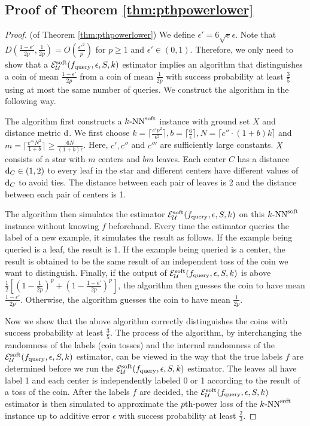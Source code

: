 \subsection{Proof of Theorem \ref{thm:pthpowerlower}}
\label{subsec:proofpthpowerlower}
\begin{proof}(of Theorem \ref{thm:pthpowerlower})
We define $\epsilon'=6\sqrt{e}\epsilon$. Note that $D(\frac{1-\epsilon'}{2p},\frac{1}{2p})=O(\frac{{\epsilon'}^2}{p})$ for $p\geq 1$ and $\epsilon'\in(0,1)$. Therefore, we only need to show that a  $\mathcal{E}^{\mathrm{soft}}_{{\mathcal{U}}}(f_{\mathrm{query}},\epsilon,S,k)$ estimator implies an algorithm that distinguishes a coin of mean $\frac{1-\epsilon'}{2p}$ from a coin of mean $\frac{1}{2p}$ with success probability at least $\frac{3}{5}$ using at most the same number of queries. We construct the algorithm in the following way.

The algorithm first constructs a ${\text{$k$-NN}^{\mathrm{soft}}}$ instance with ground set $X$ and distance metric ${\mathrm{d}}$. We first choose $k=\lceil\frac{c'p^2}{\epsilon^2}\rceil, b=\lceil\frac{6}{\epsilon}\rceil,N=\lceil c''\cdot (1+b)k\rceil$ and $m=\lceil \frac{c'''N^2}{1+b}\rceil\geq\frac{6N}{(1+b)\epsilon}$. Here, $c',c''$ and $c'''$ are sufficiently large constants. $X$ consists of a star with $m$ centers and $bm$ leaves. Each center $C$ has a distance ${\mathrm{d}}_C\in(1,2)$ to every leaf in the star and different centers have different values of ${\mathrm{d}}_C$ to avoid ties. The distance between each pair of leaves is 2 and the distance between each pair of centers is 1. 

The algorithm then simulates the estimator $\mathcal{E}^{\mathrm{soft}}_{{\mathcal{U}}}(f_{\mathrm{query}},\epsilon,S,k)$ on this ${\text{$k$-NN}^{\mathrm{soft}}}$ instance without knowing $f$ beforehand. Every time the estimator queries the label of a new example, it simulates the result as follows. If the example being queried is a leaf, the result is 1. If the example being queried is a center, the result is obtained to be the same result of an independent toss of the coin we want to distinguish. Finally, if the output of $\mathcal{E}^{\mathrm{soft}}_{{\mathcal{U}}}(f_{\mathrm{query}},\epsilon,S,k)$ is above $\frac{1}{2}[(1-\frac{1}{2p})^p+(1-\frac{1-\epsilon'}{2p})^p]$, the algorithm then guesses the coin to have mean $\frac{1-\epsilon'}{2p}$. Otherwise, the algorithm guesses the coin to have mean $\frac{1}{2p}$.

Now we show that the above algorithm correctly distinguishes the coins with success probability at least $\frac{3}{5}$. The process of the algorithm, by interchanging the randomness of the labels (coin tosses) and the internal randomness of the $\mathcal{E}^{\mathrm{soft}}_{{\mathcal{U}}}(f_{\mathrm{query}},\epsilon,S,k)$ estimator, can be viewed in the way that the true labels $f$ are determined before we run the $\mathcal{E}^{\mathrm{soft}}_{{\mathcal{U}}}(f_{\mathrm{query}},\epsilon,S,k)$ estimator. The leaves all have label 1 and each center is independently labeled 0 or 1 according to the result of a toss of the coin. After the labels $f$ are decided, the $\mathcal{E}^{\mathrm{soft}}_{{\mathcal{U}}}(f_{\mathrm{query}},\epsilon,S,k)$ estimator is then simulated  to approximate the $p$th-power loss of the ${\text{$k$-NN}^{\mathrm{soft}}}$ instance up to additive error $\epsilon$ with success probability at least $\frac{2}{3}$. 


\end{proof}

